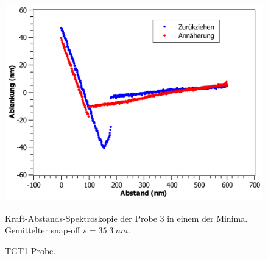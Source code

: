 \documentclass[
	a4paper,
	12pt,
	pagesize,
	ngerman
]{scrartcl}
\begin{document}
\begin{figure}[H]
{			\label{fig_br_ds5}}{\includegraphics[width=.49\linewidth]{images/BR/DS5}}
			\caption{Kraft-Abstands-Spektroskopie der Probe 3 in einem der Minima. Gemittelter snap-off $s=\SI{35.3}{nm}$.} %
			\label{fig_br_ds}
\end{figure}

\begin{figure}[H]
			\caption{TGT1 Probe.}
\end{figure}
\end{document}
